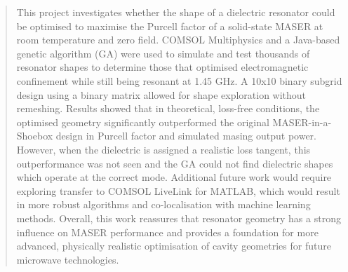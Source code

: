 \begin{abstract}
This project investigates whether the shape of a dielectric resonator could be
optimised to maximise the Purcell factor of a solid-state MASER at room
temperature and zero field. COMSOL Multiphysics\textregistered{}{} and a
Java-based genetic algorithm (GA) were used to simulate and test thousands of
resonator shapes to determine those that optimised electromagnetic confinement
while still being resonant at 1.45 GHz. A 10x10 binary subgrid design using a
binary matrix allowed for shape exploration without remeshing. Results showed
that in theoretical, loss-free conditions, the optimised geometry significantly
outperformed the original MASER-in-a-Shoebox design in Purcell factor and
simulated masing output power. However, when the dielectric is assigned a
realistic loss tangent, this outperformance was not seen and the GA could not
find dielectric shapes which operate at the correct mode. Additional future work
would require exploring transfer to COMSOL LiveLink\texttrademark{} for
MATLAB\textregistered{}{}, which would result in more robust algorithms and
co-localisation with machine learning methods. Overall, this work reassures that
resonator geometry has a strong influence on MASER performance and provides a
foundation for more advanced, physically realistic optimisation of cavity
geometries for future microwave technologies.
\end{abstract}
